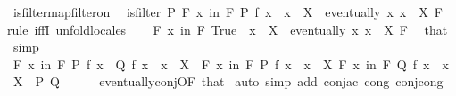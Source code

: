\begin{isabellebody}
\isanewline
{}\isamarkupfalse%
\ is{\isacharunderscore}{\kern0pt}filter{\isacharunderscore}{\kern0pt}map{\isacharunderscore}{\kern0pt}filter{\isacharunderscore}{\kern0pt}on{\isacharcolon}{\kern0pt}\isanewline
\ \ {\isachardoublequoteopen}is{\isacharunderscore}{\kern0pt}filter\ {\isacharparenleft}{\kern0pt}{\isasymlambda}P{\isachardot}{\kern0pt}\ {\isasymforall}\isactrlsub F\ x\ in\ F{\isachardot}{\kern0pt}\ P\ {\isacharparenleft}{\kern0pt}f\ x{\isacharparenright}{\kern0pt}\ {\isasymand}\ x\ {\isasymin}\ X{\isacharparenright}{\kern0pt}\ {\isasymlongleftrightarrow}\ eventually\ {\isacharparenleft}{\kern0pt}{\isasymlambda}x{\isachardot}{\kern0pt}\ x\ {\isasymin}\ X{\isacharparenright}{\kern0pt}\ F{\isachardoublequoteclose}\isanewline
%
\isadelimproof
%
\endisadelimproof
%
\isatagproof
{}\isamarkupfalse%
{\isacharparenleft}{\kern0pt}rule\ iffI{\isacharsemicolon}{\kern0pt}\ unfold{\isacharunderscore}{\kern0pt}locales{\isacharparenright}{\kern0pt}\isanewline
\ \ \isamarkupfalse%
\ {\isachardoublequoteopen}{\isasymforall}\isactrlsub F\ x\ in\ F{\isachardot}{\kern0pt}\ True\ {\isasymand}\ x\ {\isasymin}\ X{\isachardoublequoteclose}\ \ {\isachardoublequoteopen}eventually\ {\isacharparenleft}{\kern0pt}{\isasymlambda}x{\isachardot}{\kern0pt}\ x\ {\isasymin}\ X{\isacharparenright}{\kern0pt}\ F{\isachardoublequoteclose}\ \isamarkupfalse%
\ that\ \isamarkupfalse%
\ simp\isanewline
\ \ \isamarkupfalse%
\ {\isachardoublequoteopen}{\isasymforall}\isactrlsub F\ x\ in\ F{\isachardot}{\kern0pt}\ {\isacharparenleft}{\kern0pt}P\ {\isacharparenleft}{\kern0pt}f\ x{\isacharparenright}{\kern0pt}\ {\isasymand}\ Q\ {\isacharparenleft}{\kern0pt}f\ x{\isacharparenright}{\kern0pt}{\isacharparenright}{\kern0pt}\ {\isasymand}\ x\ {\isasymin}\ X{\isachardoublequoteclose}\ \ {\isachardoublequoteopen}{\isasymforall}\isactrlsub F\ x\ in\ F{\isachardot}{\kern0pt}\ P\ {\isacharparenleft}{\kern0pt}f\ x{\isacharparenright}{\kern0pt}\ {\isasymand}\ x\ {\isasymin}\ X{\isachardoublequoteclose}\ {\isachardoublequoteopen}{\isasymforall}\isactrlsub F\ x\ in\ F{\isachardot}{\kern0pt}\ Q\ {\isacharparenleft}{\kern0pt}f\ x{\isacharparenright}{\kern0pt}\ {\isasymand}\ x\ {\isasymin}\ X{\isachardoublequoteclose}\ \ P\ Q\isanewline
\ \ \ \ \isamarkupfalse%
\ eventually{\isacharunderscore}{\kern0pt}conj{\isacharbrackleft}{\kern0pt}OF\ that{\isacharbrackright}{\kern0pt}\ \isamarkupfalse%
{\isacharparenleft}{\kern0pt}auto\ simp\ add{\isacharcolon}{\kern0pt}\ conj{\isacharunderscore}{\kern0pt}ac\ cong{\isacharcolon}{\kern0pt}\ conj{\isacharunderscore}{\kern0pt}cong{\isacharparenright}{\kern0pt}\isanewline

\end{isabellebody}
